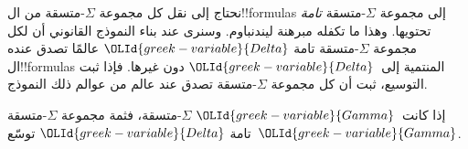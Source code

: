 \documentclass[../../../include/open-logic-section]{subfiles}
\begin{document}


نحتاج إلى نقل كل مجموعة $\Sigma$-متسقة من ال!!{formula}s إلى مجموعة
$\Sigma$-متسقة \emph{تامة} تحتويها. وهذا ما تكفله مبرهنة ليندنباوم.
وسنرى عند بناء النموذج القانوني أن لكل مجموعة $\Sigma$-متسقة تامة
$\OLId{greek-variable}{Delta}$ عالمًا تصدق عنده ال!!{formula}s المنتمية إلى~$\OLId{greek-variable}{Delta}$ دون غيرها.
فإذا ثبت التوسيع، ثبت أن كل مجموعة $\Sigma$-متسقة
تصدق عند عالم من عوالم ذلك النموذج.

\begin{thm}
  إذا كانت~$\OLId{greek-variable}{Gamma}$ $\Sigma$-متسقة، فثمة مجموعة $\Sigma$-متسقة تامة
  $\OLId{greek-variable}{Delta}$ توسّع~$\OLId{greek-variable}{Gamma}$.
\end{thm}
\end{document}
